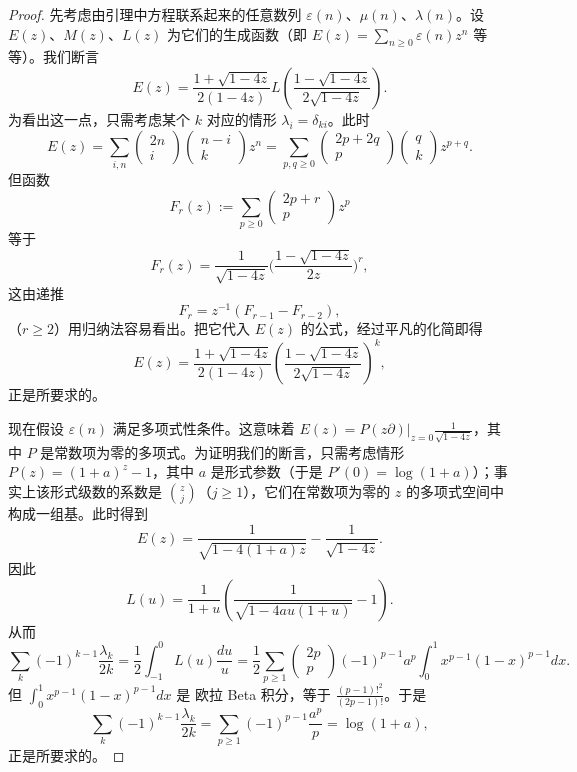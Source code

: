 \begin{proof}
先考虑由引理中方程联系起来的任意数列 $\varepsilon(n)$、$\mu(n)$、$\lambda(n)$。设 $E(z)$、$M(z)$、$L(z)$ 为它们的生成函数（即 $E(z)=\sum_{n\ge 0}\varepsilon(n)z^n$ 等等）。我们断言
$$
E(z)=\frac{1+\sqrt{1-4z}}{2(1-4z)}L\left(\frac{1-\sqrt{1-4z}}{2\sqrt{1-4z}}\right).
$$
为看出这一点，只需考虑某个 $k$ 对应的情形 $\lambda_i=\delta_{ki}$。此时
$$
E(z)=\sum_{i,n}\begin{pmatrix} 2n\\ i\end{pmatrix}
\begin{pmatrix} n-i\\ k\end{pmatrix}z^n=
\sum_{p,q\ge 0}\begin{pmatrix} 2p+2q\\ p\end{pmatrix}
\begin{pmatrix} q\\ k\end{pmatrix}z^{p+q}.
$$
但函数
$$
F_r(z):=\sum_{p\ge 0}\begin{pmatrix} 2p+r\\ p\end{pmatrix}z^p
$$
等于
$$
F_r(z)=
\frac{1}{\sqrt{1-4z}}\biggl(\frac{1-\sqrt{1-4z}}{2z}\biggr)^r,
$$
这由递推
$$
F_r=z^{-1}(F_{r-1}-F_{r-2}),
$$
（$r\ge 2$）用归纳法容易看出。把它代入 $E(z)$ 的公式，经过平凡的化简即得
$$
E(z)=\frac{1+\sqrt{1-4z}}{2(1-4z)}\left(\frac{1-\sqrt{1-4z}}{2\sqrt{1-4z}}\right)^k,
$$
正是所要求的。

现在假设 $\varepsilon(n)$ 满足多项式性条件。这意味着 $E(z)=P(z\partial)|_{z=0}\frac{1}{\sqrt{1-4z}}$，其中 $P$ 是常数项为零的多项式。为证明我们的断言，只需考虑情形 $P(z)=(1+a)^z-1$，其中 $a$ 是形式参数（于是 $P'(0)=\log(1+a)$）；事实上该形式级数的系数是 $\binom{z}{j}$（$j\ge 1$），它们在常数项为零的 $z$ 的多项式空间中构成一组基。此时得到
$$
E(z)=\frac{1}{\sqrt{1-4(1+a)z}}-\frac{1}{\sqrt{1-4z}}.
$$
因此
$$
L(u)=\frac{1}{1+u}\left(\frac{1}{\sqrt{1-4au(1+u)}}-1\right).
$$
从而
$$
\sum_k (-1)^{k-1}\frac{\lambda_k}{2k}=\frac{1}{2}\int_{-1}^0 L(u)\frac{du}{u}=
\frac{1}{2}\sum_{p\ge 1} \begin{pmatrix} 2p\\ p\end{pmatrix}
(-1)^{p-1}a^p\int_0^1x^{p-1}(1-x)^{p-1}dx.
$$
但 $\int_0^1x^{p-1}(1-x)^{p-1}dx$ 是 欧拉 Beta 积分，等于 $\frac{(p-1)!^2}{(2p-1)!}$。于是
$$
\sum_k (-1)^{k-1}\frac{\lambda_k}{2k}=\sum_{p\ge 1}(-1)^{p-1}\frac{a^p}{p}=\log(1+a),
$$
正是所要求的。
\end{proof}

